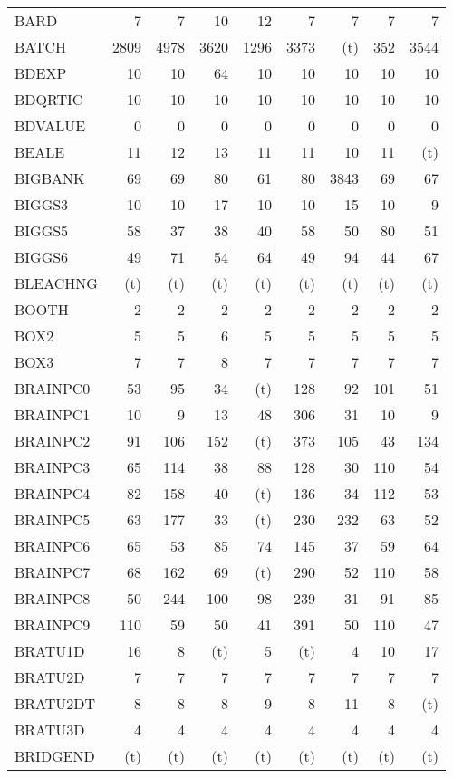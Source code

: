 \documentclass[11pt,twoside]{article}
\begin{document}
{\begin{longtable}[c]{|l|r|r|r|r|r|r|r|r|}
 BARD & 7 & 7 & 10 & 12 & 7 & 7 & 7 & 7 \\
 BATCH & 2809 & 4978 & 3620 & 1296 & 3373 & (t) & 352 & 3544 \\
 BDEXP & 10 & 10 & 64 & 10 & 10 & 10 & 10 & 10 \\
 BDQRTIC & 10 & 10 & 10 & 10 & 10 & 10 & 10 & 10 \\
 BDVALUE & 0 & 0 & 0 & 0 & 0 & 0 & 0 & 0 \\
 BEALE & 11 & 12 & 13 & 11 & 11 & 10 & 11 & (t) \\
 BIGBANK & 69 & 69 & 80 & 61 & 80 & 3843 & 69 & 67 \\
 BIGGS3 & 10 & 10 & 17 & 10 & 10 & 15 & 10 & 9 \\
 BIGGS5 & 58 & 37 & 38 & 40 & 58 & 50 & 80 & 51 \\
 BIGGS6 & 49 & 71 & 54 & 64 & 49 & 94 & 44 & 67 \\
 BLEACHNG & (t) & (t) & (t) & (t) & (t) & (t) & (t) & (t) \\
 BOOTH & 2 & 2 & 2 & 2 & 2 & 2 & 2 & 2 \\
 BOX2 & 5 & 5 & 6 & 5 & 5 & 5 & 5 & 5 \\
 BOX3 & 7 & 7 & 8 & 7 & 7 & 7 & 7 & 7 \\
 BRAINPC0 & 53 & 95 & 34 & (t) & 128 & 92 & 101 & 51 \\
 BRAINPC1 & 10 & 9 & 13 & 48 & 306 & 31 & 10 & 9 \\
 BRAINPC2 & 91 & 106 & 152 & (t) & 373 & 105 & 43 & 134 \\
 BRAINPC3 & 65 & 114 & 38 & 88 & 128 & 30 & 110 & 54 \\
 BRAINPC4 & 82 & 158 & 40 & (t) & 136 & 34 & 112 & 53 \\
 BRAINPC5 & 63 & 177 & 33 & (t) & 230 & 232 & 63 & 52 \\
 BRAINPC6 & 65 & 53 & 85 & 74 & 145 & 37 & 59 & 64 \\
 BRAINPC7 & 68 & 162 & 69 & (t) & 290 & 52 & 110 & 58 \\
 BRAINPC8 & 50 & 244 & 100 & 98 & 239 & 31 & 91 & 85 \\
 BRAINPC9 & 110 & 59 & 50 & 41 & 391 & 50 & 110 & 47 \\
 BRATU1D & 16 & 8 & (t) & 5 & (t) & 4 & 10 & 17 \\
 BRATU2D & 7 & 7 & 7 & 7 & 7 & 7 & 7 & 7 \\
 BRATU2DT & 8 & 8 & 8 & 9 & 8 & 11 & 8 & (t) \\
 BRATU3D & 4 & 4 & 4 & 4 & 4 & 4 & 4 & 4 \\
 BRIDGEND & (t) & (t) & (t) & (t) & (t) & (t) & (t) & (t) \\

\end{longtable}}
\end{document}
